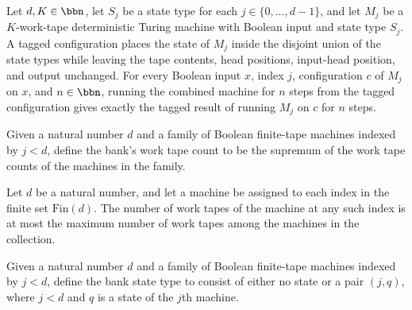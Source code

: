 \begin{lemma}
\label{Complexity.LogProg.sigmaTM_runFrom}
\leanok
{}
Let $d,K\in\bbn$, let $S_j$ be a state type for each $j\in\{0,\ldots,d-1\}$, and let
$M_j$ be a $K$-work-tape deterministic Turing machine with Boolean input and state type
$S_j$. A tagged configuration places the state of $M_j$ inside the disjoint union of the
state types while leaving the tape contents, head positions, input-head position, and
output unchanged. For every Boolean input $x$, index $j$, configuration $c$ of $M_j$ on
$x$, and $n\in\bbn$, running the combined machine for $n$ steps from the tagged
configuration gives exactly the tagged result of running $M_j$ on $c$ for $n$ steps.
\end{lemma}

\begin{definition}
\label{Complexity.LogProg.bankK}
\leanok
Given a natural number $d$ and a family of Boolean finite-tape machines indexed by
$j<d$, define the bank's work tape count to be the supremum of the work tape counts of
the machines in the family.
\end{definition}

\begin{lemma}
\label{Complexity.LogProg.le_bankK}
\leanok
{}
Let $d$ be a natural number, and let a machine be assigned to each index in the finite
set $\text{Fin}(d)$. The number of work tapes of the machine at any such index is at most
the maximum number of work tapes among the machines in the collection.
\end{lemma}

\begin{definition}
\label{Complexity.LogProg.BankS}
\leanok
Given a natural number $d$ and a family of Boolean finite-tape machines indexed by
$j<d$, define the bank state type to consist of either no state or a pair $(j,q)$, where
$j<d$ and $q$ is a state of the $j$th machine.
\end{definition}

